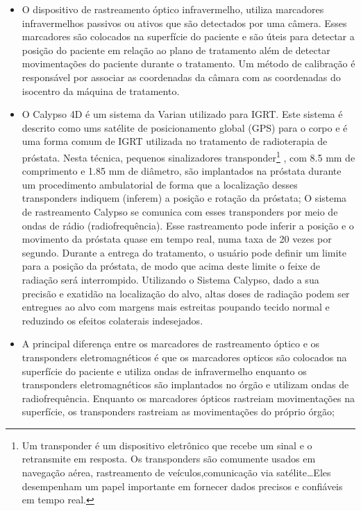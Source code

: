 \documentclass[11pt,a4paper]{article}
\newcounter{exemplo}
\begin{document}
\begin{exemplo}[12. IGRT ]
\begin{itemize}
        \item O dispositivo de rastreamento óptico infravermelho, utiliza marcadores infravermelhos passivos ou ativos que são detectados por uma câmera. Esses marcadores são colocados na superfície do paciente e são úteis para detectar a posição do paciente em relação ao plano de tratamento além de detectar movimentações do paciente durante o tratamento. Um método de calibração é responsável por associar as coordenadas da câmara com as coordenadas do isocentro da máquina de tratamento.
        
        \item O Calypso 4D é um sistema da Varian utilizado para IGRT. Este sistema é descrito como ums satélite de posicionamento global (GPS) para o corpo e é uma forma comum de IGRT utilizada no tratamento de radioterapia de próstata. Nesta técnica,  pequenos sinalizadores transponder\footnote{Um transponder é um dispositivo eletrônico que recebe um sinal e o retransmite em resposta. Os transponders são comumente usados em navegação aérea, rastreamento de veículos,comunicação via satélite\dots Eles desempenham um papel importante em fornecer dados precisos e confiáveis em tempo real.} , com 8.5 mm de comprimento e 1.85 mm de diâmetro, são implantados na próstata durante um procedimento ambulatorial de forma que a localização desses transponders indiquem (inferem) a posição e rotação da próstata; O sistema de rastreamento Calypso se comunica com esses transponders por meio de ondas de rádio (radiofrequência). Esse rastreamento pode inferir a posição e o movimento da próstata quase em tempo real, numa taxa de 20 vezes por segundo. Durante a entrega do tratamento, o usuário pode definir um limite para a posição da próstata, de modo que acima deste limite o feixe de radiação será interrompido. Utilizando o Sistema Calypso, dado a sua precisão e exatidão na localização do alvo, altas doses de radiação podem ser entregues ao alvo com margens mais estreitas poupando tecido normal e reduzindo os efeitos colaterais indesejados.
        
        \item A principal diferença entre os marcadores de rastreamento óptico e os transponders eletromagnéticos é que os marcadores opticos são colocados na superfície do paciente e utiliza ondas de infravermelho enquanto os transponders eletromagnéticos são implantados no órgão e utilizam ondas de radiofrequência. Enquanto os marcadores ópticos rastreiam movimentações na superfície, os transponders rastreiam as movimentações do próprio órgão;
        

\end{itemize}
\end{exemplo}
\end{document}

